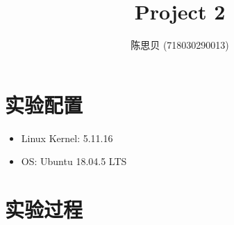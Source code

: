 \documentclass[UTF8]{ctexrep}
\title{
    \horrule{0.5pt} \\[0.4cm]
    \huge Project 2 \\
    \horrule{2pt}
}
\author{
    陈思贝 (718030290013)
}
\date{
}
\begin{document}
    \maketitle

    \section{实验配置}

    \begin{itemize}
        \item Linux Kernel: 5.11.16
        \item OS: Ubuntu 18.04.5 LTS
    \end{itemize}
    \vspace{.3cm}

    \section{实验过程}
\end{document}
